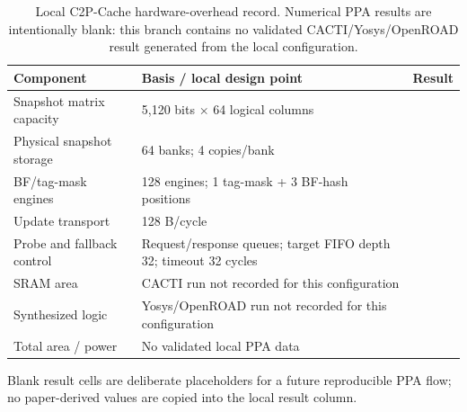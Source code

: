 \documentclass[10pt]{article}
\begin{document}
\begin{table}[ht]
\centering
\caption{Local C2P-Cache hardware-overhead record. Numerical PPA results are intentionally blank: this branch contains no validated CACTI/Yosys/OpenROAD result generated from the local configuration.}
\label{tab:c2p-local-overhead}
\small
\begin{tabular}{@{}p{1.85in}p{3.70in}p{0.95in}@{}}
\toprule
\textbf{Component} & \textbf{Basis / local design point} & \textbf{Result} \\
\midrule
Snapshot matrix capacity & 5,120 bits $\times$ 64 logical columns & \\
Physical snapshot storage & 64 banks; 4 copies/bank & \\
BF/tag-mask engines & 128 engines; 1 tag-mask + 3 BF-hash positions & \\
Update transport & 128 B/cycle & \\
Probe and fallback control & Request/response queues; target FIFO depth 32; timeout 32 cycles & \\
SRAM area & CACTI run not recorded for this configuration & \\
Synthesized logic & Yosys/OpenROAD run not recorded for this configuration & \\
Total area / power & No validated local PPA data & \\
\bottomrule
\end{tabular}
\par\medskip
\footnotesize Blank result cells are deliberate placeholders for a future reproducible PPA flow; no paper-derived values are copied into the local result column.
\end{table}
\end{document}
